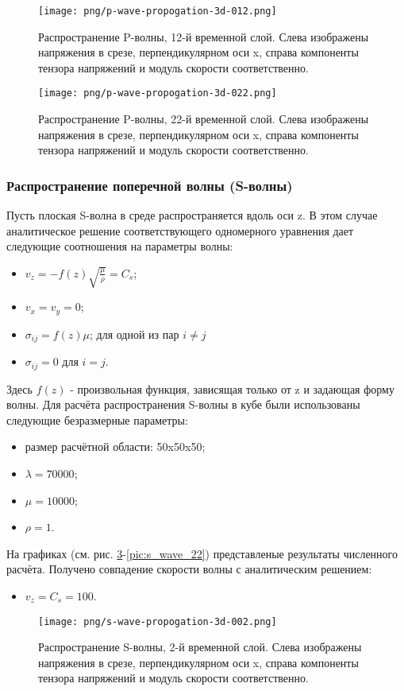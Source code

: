 \begin{figure}[htp]
\centering
\texttt{[image: png/p-wave-propogation-3d-012.png]}
\caption{Распространение P-волны, 12-й временной слой. Слева изображены
напряжения в срезе, перпендикулярном оси x, справа компоненты тензора напряжений
и модуль скорости соответственно.}
\label{pic:p_wave_12}
\end{figure}
\begin{figure}[htp]
\centering
\texttt{[image: png/p-wave-propogation-3d-022.png]}
\caption{Распространение P-волны, 22-й временной слой. Слева изображены
напряжения в срезе, перпендикулярном оси x, справа компоненты тензора напряжений
и модуль скорости соответственно.}
\label{pic:p_wave_22}
\end{figure}
\subsubsection{Распространение поперечной волны (S-волны)}
Пусть плоская S-волна в среде распространяется вдоль оси z. В этом случае аналитическое решение соответствующего одномерного уравнения дает следующие соотношения на параметры волны:
\begin{itemize}
\item $v_z=-f(z)\sqrt{\frac{\mu}{\rho}}=C_s$;
\item $v_x=v_y=0$;
\item $\sigma_{ij}=f(z)\mu$; для одной из пар $i \neq j$
\item $\sigma_{ij}=0$ для $i = j$.
\end{itemize}
Здесь $f(z)$ - произвольная функция, зависящая только от z и задающая форму волны.
Для расчёта распространения S-волны в кубе были использованы следующие безразмерные параметры: 
\begin{itemize}
\item размер расчётной области: 50x50x50;
\item $\lambda=70000$;
\item $\mu=10000$;
\item $\rho=1$.
\end{itemize}
На графиках (см. рис.
\ref{pic:s_wave_2}-\ref{pic:s_wave_22}) представленые результаты численного расчёта. Получено совпадение скорости волны с аналитическим решением:
\begin{itemize}
\item $v_z=C_s=100$.
\end{itemize}
\begin{figure}[htp]
\centering
\texttt{[image: png/s-wave-propogation-3d-002.png]}
\caption{Распространение S-волны, 2-й временной слой. Слева изображены
напряжения в срезе, перпендикулярном оси x, справа компоненты тензора напряжений
и модуль скорости соответственно.}
\label{pic:s_wave_2}
\end{figure}
